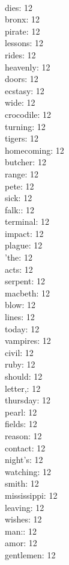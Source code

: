 \begin{multicols}{6}
  \\ dies: 12
  \\ bronx: 12
  \\ pirate: 12
  \\ lessons: 12
  \\ rides: 12
  \\ heavenly: 12
  \\ doors: 12
  \\ ecstasy: 12
  \\ wide: 12
  \\ crocodile: 12
  \\ turning: 12
  \\ tigers: 12
  \\ homecoming: 12
  \\ butcher: 12
  \\ range: 12
  \\ pete: 12
  \\ sick: 12
  \\ falk:: 12
  \\ terminal: 12
  \\ impact: 12
  \\ plague: 12
  \\ 'the: 12
  \\ acts: 12
  \\ serpent: 12
  \\ macbeth: 12
  \\ blow: 12
  \\ lines: 12
  \\ today: 12
  \\ vampires: 12
  \\ civil: 12
  \\ ruby: 12
  \\ should: 12
  \\ letter,: 12
  \\ thursday: 12
  \\ pearl: 12
  \\ fields: 12
  \\ reason: 12
  \\ contact: 12
  \\ night's: 12
  \\ watching: 12
  \\ smith: 12
  \\ mississippi: 12
  \\ leaving: 12
  \\ wishes: 12
  \\ man:: 12
  \\ amor: 12
  \\ gentlemen: 12

\end{multicols}
